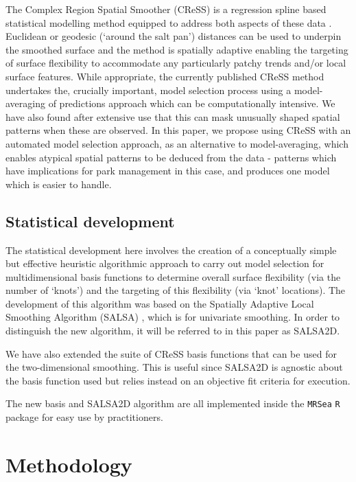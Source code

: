 \documentclass[letterpaper]{interact}
\begin{document}
The Complex Region Spatial Smoother (CReSS) is a regression spline based statistical modelling method equipped to address both aspects of these data  \cite{scott2014}. Euclidean or geodesic (`around the salt pan') distances can be used to underpin the smoothed surface and the method is spatially adaptive enabling the targeting of surface flexibility to accommodate any particularly patchy trends and/or local surface features. While appropriate, the currently published CReSS method \cite{scott2014} undertakes the, crucially important, model selection process using a model-averaging of predictions approach which can be computationally intensive. We have also found after extensive use that this can mask unusually shaped spatial patterns when these are observed. In this paper, we propose using CReSS with an automated model selection approach, as an alternative to model-averaging, which enables atypical spatial patterns to be deduced from the data - patterns which have implications for park management in this case, and produces one model which is easier to handle.


\subsection{Statistical development}\label{statistical-development}

The statistical development here involves the creation of a conceptually simple but effective heuristic algorithmic approach to carry out model selection for multidimensional basis functions to determine overall surface flexibility (via the number of `knots') and the targeting of this flexibility (via `knot' locations). The development of this algorithm was based on the Spatially Adaptive Local Smoothing Algorithm (SALSA) \cite{Walk2010}, which is for univariate smoothing. In order to distinguish the new algorithm, it will be referred to in this paper as SALSA2D.

We have also extended the suite of CReSS basis functions that can be used for the two-dimensional smoothing. This is useful since SALSA2D is agnostic about the basis function used but relies instead on an objective fit criteria for execution.

The new basis and SALSA2D algorithm are all implemented inside the \texttt{MRSea} \texttt{R} package \cite{scott2017, Rcran2019} for easy use by practitioners.

\section{Methodology}
\end{document}
